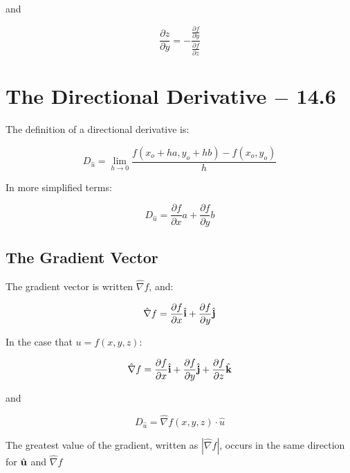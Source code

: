 \documentclass[12pt]{article}
\begin{document}
and

$$\frac{\partial z}{\partial y}=-\frac{\frac{\partial f}{\partial y}}{\frac{\partial f}{\partial z}}$$

\section{The Directional Derivative $-$ 14.6}

The definition of a directional derivative is:

$$ D_{\hat{u}}=\lim_{h\to0} \frac{f(x_o+ha, y_o + hb)-f(x_o,y_o)}{h} $$

In more simplified terms:

$$D_{\hat{u}}=\frac{\partial f}{\partial x} a + \frac{\partial f}{\partial y} b$$

\subsection{The Gradient Vector}

The gradient vector is written $\hat{\nabla} f$, and:

$$\hat{\nabla} f = \frac{\partial f}{\partial x}\hat{\bold{i}} + \frac{\partial f}{\partial y}\hat{\bold{j}}$$

In the case that $u = f(x,y,z)$:

$$\hat{\nabla} f = \frac{\partial f}{\partial x}\hat{\bold{i}} + \frac{\partial f}{\partial y}\hat{\bold{j}}+\frac{\partial f}{\partial z}\hat{\bold{k}}$$

and

$$D_{\hat{u}}=\hat{\nabla}f(x,y,z)\cdot\hat{u}$$

The greatest value of the gradient, written as $|\hat{\nabla}f|$, occurs in the same direction for $\hat{\bold{u}}$ and $\hat{\nabla}f$
\end{document}
